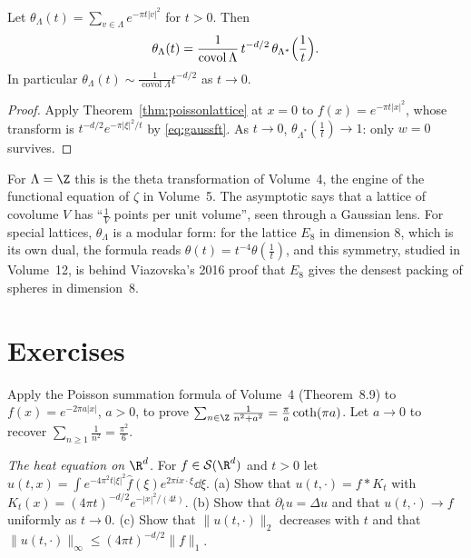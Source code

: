 \begin{corollary}\label{cor:thetalattice}
Let $\theta_\Lambda(t)=\sum_{v\in\Lambda}e^{-\pi t|v|^2}$ for $t>0$. Then
\[\theta_\Lambda(t)=\frac1{\operatorname{covol}\Lambda}\,t^{-d/2}\,\theta_{\Lambda^*}\Bigl(\frac1t\Bigr).\]
In particular $\theta_\Lambda(t)\sim\frac1{\operatorname{covol}\Lambda}t^{-d/2}$ as $t\to0$.
\end{corollary}
\begin{proof}
Apply Theorem~\ref{thm:poissonlattice} at $x=0$ to $f(x)=e^{-\pi t|x|^2}$, whose transform is $t^{-d/2}e^{-\pi|\xi|^2/t}$ by \eqref{eq:gaussft}. As $t\to0$, $\theta_{\Lambda^*}(\frac1t)\to1$: only $w=0$ survives.
\end{proof}

For $\Lambda=\Z$ this is the theta transformation of Volume~4, the engine of the functional equation of $\zeta$ in Volume~5. The asymptotic says that a lattice of covolume $V$ has ``$\frac1V$ points per unit
volume'', seen through a Gaussian lens. For special lattices, $\theta_\Lambda$ is a modular form: for the lattice $E_8$ in dimension $8$, which is its own dual, the formula reads $\theta(t)=t^{-4}\theta(\frac1t)$, and
this symmetry, studied in Volume~12, is behind Viazovska's 2016 proof that $E_8$ gives the densest packing of spheres in dimension~$8$.

\section{Exercises}

\begin{exercise}[$\star$]\label{ex:cothsum}
Apply the Poisson summation formula of Volume~4 (Theorem~8.9) to $f(x)=e^{-2\pi a|x|}$, $a>0$, to prove $\sum_{n\in\Z}\frac1{n^2+a^2}=\frac\pi a\coth(\pi a)$. Let $a\to0$ to recover $\sum_{n\ge1}\frac1{n^2}=\frac{\pi^2}6$.
\end{exercise}

\begin{exercise}[$\star$]\label{ex:heatft}
\emph{The heat equation on $\R^d$.} For $f\in\mathcal S(\R^d)$ and $t>0$ let $u(t,x)=\int e^{-4\pi^2t|\xi|^2}\hat f(\xi)e^{2\pi ix\cdot\xi}\dd\xi$. (a) Show that $u(t,\cdot)=f*K_t$ with $K_t(x)=(4\pi t)^{-d/2}e^{-|x|^2/(4t)}$. (b) Show that
$\partial_tu=\Delta u$ and that $u(t,\cdot)\to f$ uniformly as $t\to0$. (c) Show that $\|u(t,\cdot)\|_2$ decreases with $t$ and that $\|u(t,\cdot)\|_\infty\le(4\pi t)^{-d/2}\|f\|_1$.
\end{exercise}

